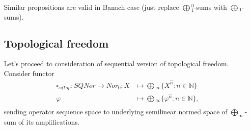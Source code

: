 \documentclass[12pt]{article}
\begin{document}
Similar propositions are valid in Banach case (just replace $\bigoplus{}_1^0$-sums with $\bigoplus{}_1$-sums).








































\subsection{Topological freedom}

Let's proceed to consideration of sequential version of topological  freedom. Consider functor
$$
\begin{aligned}
\square_{sqTop} : SQNor \to Nor_0: X &\mapsto \bigoplus{}_\infty \{X^{\wideparen{n}} : n \in \mathbb{N}\}\\
\varphi&\mapsto\bigoplus{}_\infty\{\varphi^{\wideparen{n}}:n\in\mathbb{N}\},\\
\end{aligned}
$$
sending operator sequence space to underlying semilinear normed space of $\bigoplus_\infty$-sum of its amplifications.
\end{document}
